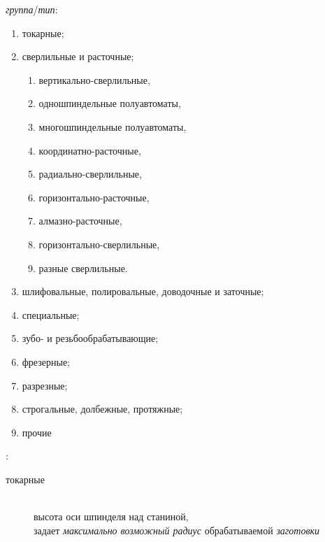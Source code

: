 \bigskip
\noindent\emph{группа}/\emph{тип}:
\begin{enumerate}[label={\arabic*}]
  \item токарные;
  \item сверлильные и расточные;
  \begin{enumerate}[label={\arabic*}]
    \item вертикально-сверлильные,
    \item одношпиндельные полуавтоматы,
    \item многошпиндельные полуавтоматы,
    \item координатно-расточные,
    \item радиально-сверлильные,
    \item горизонтально-расточные,
    \item алмазно-расточные,
    \item горизонтально-сверлильные,
    \item разные сверлильные.  
  \end{enumerate}
  \item шлифовальные, полировальные, доводочные и заточные;
  \item специальные;
  \item зубо- и резьбообрабатывающие;
  \item фрезерные;
  \item разрезные;
  \item строгальные, долбежные, протяжные;
  \item прочие
\end{enumerate}

\bigskip
{}:
\begin{description}
\item[токарные] \hfill \\
высота оси шпинделя над станиной, \\
задает \emph{максимально возможный радиус} обрабатываемой \emph{заготовки}
\end{description}



\secup

\secup
